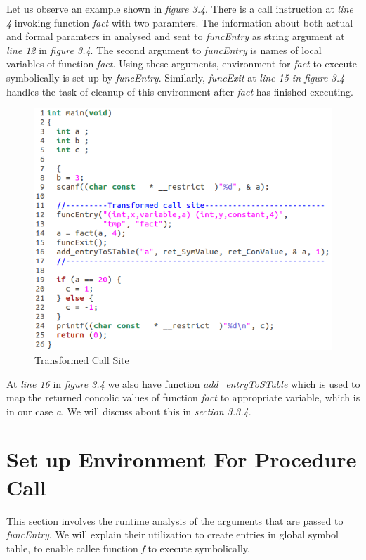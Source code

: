 \documentclass[12pt,oneside]{book}
\begin{document}
Let us observe an example shown in \textit{figure 3.4}. There is a call instruction at \textit{line 4} invoking function \textit{fact} with two paramters. The information about both actual and formal paramters in analysed and sent to \textit{funcEntry} as string argument at \textit{line 12} in \textit{figure 3.4}. The second argument to \textit{funcEntry} is names of local variables of function \textit{fact}. Using these arguments, environment for \textit{fact} to execute symbolically is set up by \textit{funcEntry}. Similarly, \textit{funcExit} at \textit{line 15 in figure 3.4} handles the task of cleanup of this environment after \textit{fact} has finished executing.

\vspace{0.4cm}
\begin{figure}[htbp]
\centering
\includegraphics[scale=0.56]{env2_modified.png}
\caption{Transformed Call Site}
\end{figure}  

At \textit{line 16} in \textit{figure 3.4} we also have function \textit{add\_entryToSTable} which is used to map the returned concolic values of function \textit{fact} to appropriate variable, which is in our case \textit{a}. We will discuss about this in \textit{section 3.3.4}. 

\newpage

\section{Set up Environment For Procedure Call}
This section involves the runtime analysis of the arguments that are passed to \textit{funcEntry}. We will explain their utilization to create entries in global symbol table, to enable callee function \textit{f} to execute symbolically.
\end{document}
